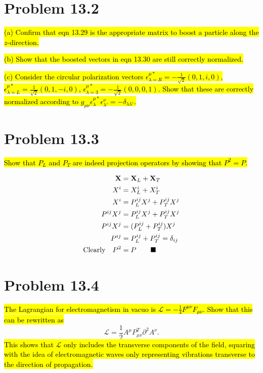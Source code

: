 \documentclass{article}
\begin{document}
\section*{Problem 13.2}
\begin{quoting}
  \hl{(a)  Confirm that eqn 13.29 is the appropriate matrix to boost a particle along the $z$-direction.}

  \hl{(b)  Show that the boosted vectors in eqn 13.30 are still correctly normalized.}

  \hl{(c)  Consider the circular polarization vectors $\epsilon^{\mu*}_{\lambda=R}=-\frac{1}{\sqrt{2}}(0,1,i,0)$, $\epsilon^{\mu*}_{\lambda=L}=\frac{1}{\sqrt{2}}(0,1,-i,0)$, $\epsilon^{\mu*}_{\lambda=3}=-\frac{1}{\sqrt{2}}(0,0,0,1)$. Show that these are correctly normalized according to $g_{\mu\nu}\epsilon^{\mu*}_\lambda \epsilon^\nu_{\lambda'}=-\delta_{\lambda\lambda'}$.}
\end{quoting}



\section*{Problem 13.3}
\begin{quoting}
  \hl{Show that $P_L$ and $P_T$ are indeed projection operators by showing that $P^2=P$.}
\end{quoting}
\begin{align*}
  \vb{X}           & =\vb{X}_L+\vb{X}_T             \\
  X^i              & =X^i_L+X^i_T                   \\
  X^i              & =P^{ij}_LX^j+P^{ij}_TX^j       \\
  P^{ij}X^j        & =P^{ij}_LX^j+P^{ij}_TX^j       \\
  P^{ij}X^j        & =(P^{ij}_L+P^{ij}_T)X^j        \\
  P^{ij}           & =P^{ij}_L+P^{ij}_T=\delta_{ij} \\
  \qq*{Clearly}P^2 & =P\qquad\blacksquare
\end{align*}



\section*{Problem 13.4}
\begin{quoting}
  \hl{The Lagrangian for electromagnetism in vacuo is $\mathcal{L}=-\frac{1}{4}F^{\mu\nu}F_{\mu\nu}$. Show that this can be rewritten as}\[\mathcal{L}=\frac{1}{2}A^\mu P^T_{\mu\nu}\partial^2A^\nu.\]
  \hl{This shows that $\mathcal{L}$ only includes the transverse components of the field, squaring with the idea of electromagnetic waves only representing vibrations transverse to the direction of propagation.}
\end{quoting}
\end{document}
